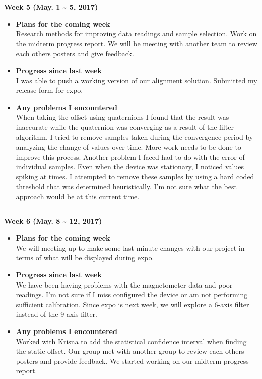 	\begin{center}
		\textbf{Week 5 (May. 1 {\textasciitilde{}} 5, 2017)}
	\end{center}
	\begin{itemize}
		\item \textbf{Plans for the coming week}
		\\Research methods for improving data readings and sample selection. Work on the midterm progress report. We will be meeting with another team to review each others posters and give feedback.\\

		\item \textbf{Progress since last week}
		\\I was able to push a working version of our alignment solution. Submitted my release form for expo.\\

		\item \textbf{Any problems I encountered}
		\\When taking the offset using quaternions I found that the result was inaccurate while the quaternion was converging as a result of the filter algorithm. I tried to remove samples taken during the convergence period by analyzing the change of values over time. More work needs to be done to improve this process. Another problem I faced had to do with the error of individual samples. Even when the device was stationary, I noticed values spiking at times. I attempted to remove these samples by using a hard coded threshold that was determined heuristically. I'm not sure what the best approach would be at this current time.\\
	\end{itemize}

	\rule{\textwidth}{0.5pt}

	\begin{center}
		\textbf{Week 6 (May. 8 {\textasciitilde{}} 12, 2017)}
	\end{center}
	\begin{itemize}
		\item \textbf{Plans for the coming week}
		\\We will meeting up to make some last minute changes with our project in terms of what will be displayed during expo.\\

		\item \textbf{Progress since last week}
		\\We have been having problems with the magnetometer data and poor readings. I'm not sure if I miss configured the device or am not performing sufficient calibration. Since expo is next week, we will explore a 6-axis filter instead of the 9-axis filter.\\

		\item \textbf{Any problems I encountered}
		\\Worked with Krisna to add the statistical confidence interval when finding the static offset. Our group met with another group to review each others posters and provide feedback. We started working on our midterm progress report.\\
	\end{itemize}

